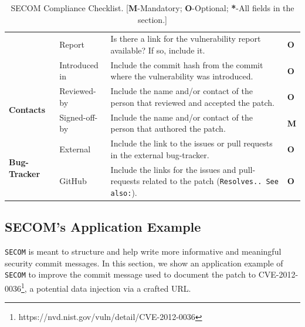 \begin{table}
\begin{tabular}{ | p{1.75cm} | p{1.75cm} | p{11.75cm} | p{0.25cm} | }
                                & Report & Is there a link for the vulnerability report available? If so, include it. & \textbf{O} \\\cline{2-4}
                                & Introduced in	 & Include the commit hash from the commit where the vulnerability was introduced. & \textbf{O} \\
    \hline\hline
        \multirow{2}{*}{\textbf{Contacts}} & Reviewed-by & Include the name and/or contact of the person that reviewed and accepted the patch.  & \textbf{O}\\\cline{2-4}
                                    & Signed-off-by	 & Include the name and/or contact of the person that authored the patch.	  & \textbf{M}\\
    \hline\hline
        \multirow{2}{*}{\textbf{Bug-Tracker}} & External & Include the link to the issues or pull requests in the external bug-tracker. & \textbf{O}\\\cline{2-4}
                                    & GitHub	 & Include the links for the issues and pull-requests related to the patch (\texttt{Resolves.. See also:}).	  & \textbf{O}\\
    \hline
    \end{tabular}
    \caption{SECOM Compliance Checklist. [\textbf{M}-Mandatory; \textbf{O}-Optional; \textbf{*}-All fields in the section.]}
    \label{tab:checklist}
\end{table}

\subsection{SECOM's Application Example}

\texttt{SECOM} is meant to structure and help write more informative and meaningful
security commit messages. In this section, we show an application example of \texttt{SECOM}
to improve the commit message used to document the patch to CVE-2012-0036\footnote{https://nvd.nist.gov/vuln/detail/CVE-2012-0036}, a potential data injection via a crafted URL.


